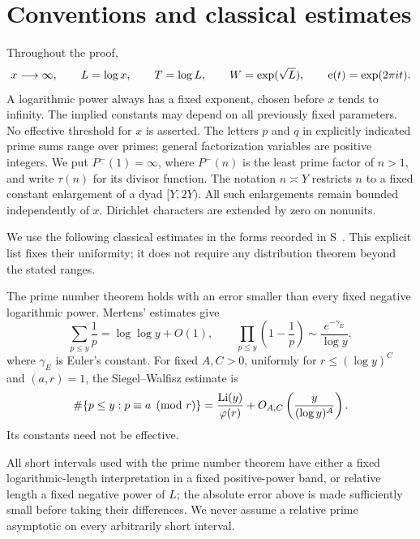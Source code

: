 \section{Conventions and classical estimates}\label{sec:preliminaries}

Throughout the proof,
\[
 x\longrightarrow\infty,\qquad L=\log x,\qquad T=\log L,
 \qquad W=\exp(\sqrt L),\qquad \mathrm{e}(t)=\exp(2\pi i t).
\]
A logarithmic power always has a fixed exponent, chosen before $x$
tends to infinity. The implied constants may depend on all previously
fixed parameters. No effective threshold for $x$ is asserted.
The letters $p$ and $q$ in explicitly indicated prime sums range over
primes; general factorization variables are positive integers.
We put $P^-(1)=\infty$, where $P^-(n)$ is the least prime factor of
$n>1$, and write $\tau(n)$ for its divisor function. The notation
$n\asymp Y$ restricts $n$ to a fixed constant enlargement of a dyad
$[Y,2Y)$. All such enlargements remain bounded independently of $x$.
Dirichlet characters are extended by zero on nonunits.

We use the following classical estimates in the forms recorded in
S~\cite[Section~2]{SmoothShifted}. This explicit list fixes their
uniformity; it does not require any distribution theorem beyond the
stated ranges.

\begin{proposition}\label{pre:primes}
The prime number theorem holds with an error smaller than every fixed
negative logarithmic power. Mertens' estimates give
\[
 \sum_{p\le y}\frac1p=\log\log y+O(1),\qquad
 \prod_{p\le y}\left(1-\frac1p\right)
 \sim\frac{e^{-\gamma_E}}{\log y},
\]
where $\gamma_E$ is Euler's constant. For fixed $A,C>0$, uniformly
for $r\le(\log y)^C$ and $(a,r)=1$, the Siegel--Walfisz estimate is
\[
 \#\{p\le y:p\equiv a\pmod r\}
 =\frac{\operatorname{Li}(y)}{\varphi(r)}
   +O_{A,C}\left(\frac{y}{(\log y)^A}\right).
\]
Its constants need not be effective.
\end{proposition}

All short intervals used with the prime number theorem have either a
fixed logarithmic-length interpretation in a fixed positive-power
band, or relative length a fixed negative power of $L$; the absolute
error above is made sufficiently small before taking their
differences. We never assume a relative prime asymptotic on every
arbitrarily short interval.

